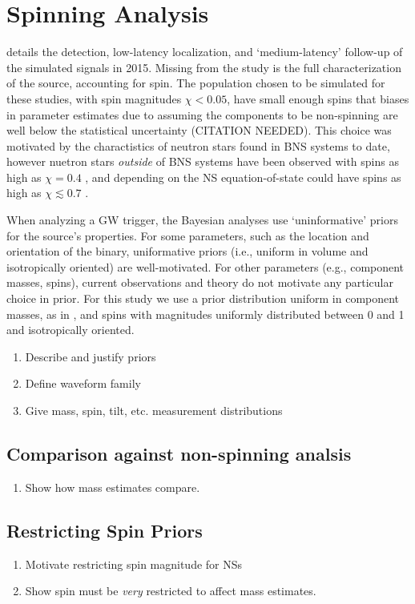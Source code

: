 \section{Spinning Analysis}

\citet{2013arXiv1304.0670L} details the detection, low-latency localization, and `medium-latency' follow-up of the simulated signals in 2015.  Missing from the study is the full characterization of the source, accounting for spin.  The population chosen to be simulated for these studies, with spin magnitudes $\chi < 0.05$, have small enough spins that biases in parameter estimates due to assuming the components to be non-spinning are well below the statistical uncertainty (CITATION NEEDED).  This choice was motivated by the charactistics of neutron stars found in BNS systems to date, however nuetron stars \emph{outside} of BNS systems have been observed with spins as high as $\chi = 0.4$ \cite{Hessels_2006,Brown_2012}, and depending on the NS equation-of-state could have spins as high as $\chi \lesssim 0.7$ \cite{Lo_2011}.

When analyzing a GW trigger, the Bayesian analyses use `uninformative' priors for the source's properties.  For some parameters, such as the location and orientation of the binary, uniformative priors (i.e., uniform in volume and isotropically oriented) are well-motivated.  For other parameters (e.g., component masses, spins), current observations and theory do not motivate any particular choice in prior.  For this study we use a prior distribution uniform in component masses, as in \citet{2013arXiv1304.0670L}, and spins with magnitudes uniformly distributed between 0 and 1 and isotropically oriented.


\begin{enumerate}
\item Describe and justify priors
\item Define waveform family
\item Give mass, spin, tilt, etc. measurement distributions
\end{enumerate}


\subsection{Comparison against non-spinning analsis}

\begin{enumerate}
\item Show how mass estimates compare.
\end{enumerate}


\subsection{Restricting Spin Priors}

\begin{enumerate}
\item Motivate restricting spin magnitude for NSs
\item Show spin must be \textit{very} restricted to affect mass estimates.
\end{enumerate}